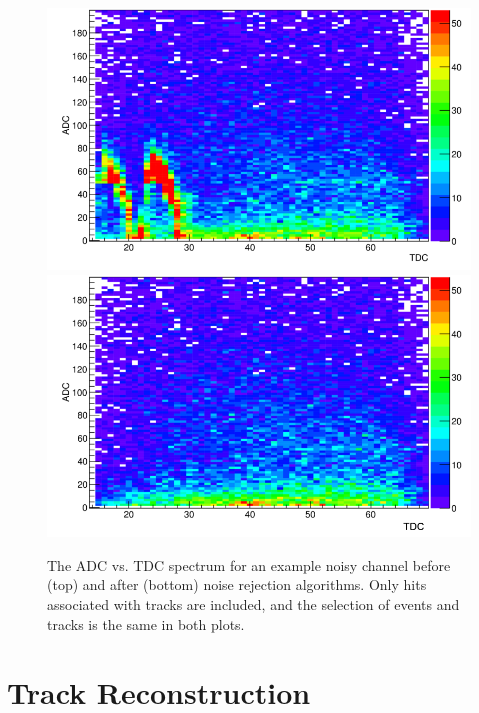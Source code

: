 \documentclass[twocolumn,showpacs,superscriptaddress,groupedaddress]{revtex4}
\begin{document}
\begin{figure}[tb]\centering
\includegraphics[scale=0.27]{fig/noisy_pad_before_rejection2.png}
\includegraphics[scale=0.27]{fig/noisy_pad_after_rejection2.png}
\caption{The ADC vs. TDC spectrum for an example noisy channel before (top) and after (bottom) noise rejection algorithms.  Only hits associated with tracks are included, and the selection of events and tracks is the same in both plots.}
\label{fig:noise}
\end{figure}


\section{Track Reconstruction}\label{sec_perf}
\end{document}
